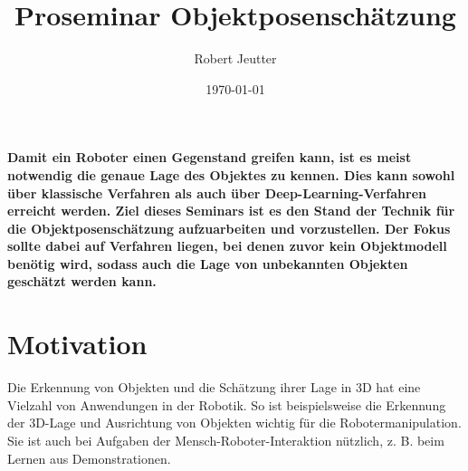 \documentclass[a4paper, 11pt]{article}
\title{Proseminar Objektposenschätzung}
\author{Robert Jeutter}
\date{\today}
\begin{document}
\maketitle

\begin{multicols*}{2}
    \textbf{
        Damit ein Roboter einen Gegenstand greifen kann, ist es meist notwendig die genaue Lage des Objektes zu kennen. Dies kann sowohl über klassische Verfahren als auch über Deep-Learning-Verfahren erreicht werden. Ziel dieses Seminars ist es den Stand der Technik für die Objektposenschätzung aufzuarbeiten und vorzustellen. Der Fokus sollte dabei auf Verfahren liegen, bei denen zuvor kein Objektmodell benötig wird, sodass auch die Lage von unbekannten Objekten geschätzt werden kann.
    }

    \section{Motivation}
    Die Erkennung von Objekten und die Schätzung ihrer Lage in 3D hat eine Vielzahl von Anwendungen in der Robotik. So ist beispielsweise die Erkennung der 3D-Lage und Ausrichtung von Objekten wichtig für die Robotermanipulation. Sie ist auch bei Aufgaben der Mensch-Roboter-Interaktion nützlich, z. B. beim Lernen aus Demonstrationen.


\end{multicols*}
\end{document}
